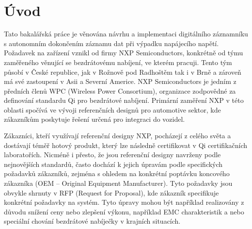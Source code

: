 
%


\chapter{Úvod}
\label{uvod}
Tato bakalářská práce je věnována návrhu a implementaci digitálního záznamníku s autonomním dokončením záznamu dat při výpadku napájecího napětí. Požadavek na zařízení vznikl od firmy NXP Semiconductors, konkrétně od týmu zaměřeného věnující se bezdrátovému nabíjení, ve kterém pracuji. Tento tým působí v České republice, jak v Rožnově pod Radhoštěm tak i v Brně a zároveň má své zastoupení v Asii a Severní Americe. NXP Semiconductors je jedním z předních členů WPC (Wireless Power Consortium), organizace zodpovědné za definování standardu Qi pro bezdrátové nabíjení. Primární zaměření NXP v této oblasti spočívá ve vývoji referenčních designů pro automotive sektor, kde zákazníkům poskytuje řešení určená pro integraci do vozidel.

Zákazníci, kteří využívají referenční designy NXP, pocházejí z celého světa a dostávají téměř hotový produkt, který lze následně certifikovat v Qi certifikačních laboratořích. Nicméně i přesto, že jsou referenční designy navrženy podle nejnovějších standardů, často dochází k jejich úpravám podle specifických požadavků zákazníků, zejména s ohledem na konkrétní poptávku koncového zákazníka (OEM – Original Equipment Manufacturer). Tyto požadavky jsou obvykle shrnuty v RFP (Request for Proposal), kde zákazník specifikuje konkrétní požadavky na systém. Tyto úpravy mohou být například realizovány z důvodu snížení ceny nebo zlepšení výkonu, například EMC charakteristik a nebo speciální chování bezdrátové nabíječky v krajních situacích. 

